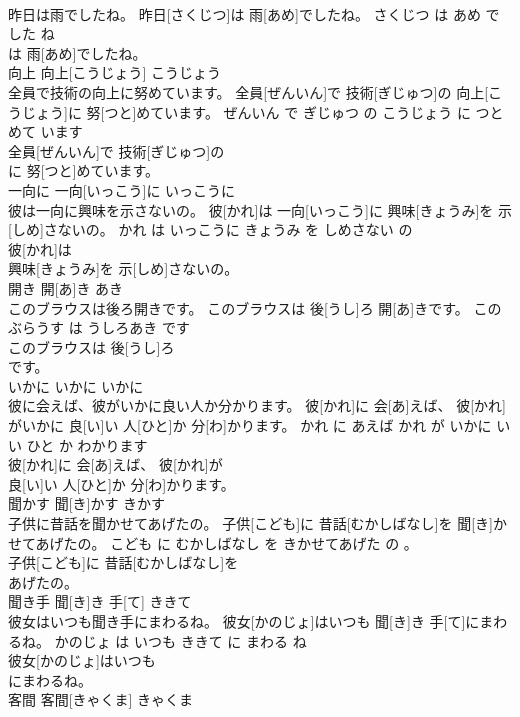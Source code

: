 \documentclass[8pt]{extreport}
\begin{document}
\begin{CJK}{UTF8}{min}
\\	昨日は雨でしたね。	昨日[さくじつ]は 雨[あめ]でしたね。	さくじつ は あめ でした ね	
\\	は 雨[あめ]でしたね。			
\\	向上	向上[こうじょう]	こうじょう	
\\	全員で技術の向上に努めています。	全員[ぜんいん]で 技術[ぎじゅつ]の 向上[こうじょう]に 努[つと]めています。	ぜんいん で ぎじゅつ の こうじょう に つとめて います	
\\	全員[ぜんいん]で 技術[ぎじゅつ]の
\\	に 努[つと]めています。			
\\	一向に	一向[いっこう]に	いっこうに	
\\	彼は一向に興味を示さないの。	彼[かれ]は 一向[いっこう]に 興味[きょうみ]を 示[しめ]さないの。	かれ は いっこうに きょうみ を しめさない の	
\\	彼[かれ]は
\\	興味[きょうみ]を 示[しめ]さないの。			
\\	開き	開[あ]き	あき	
\\	このブラウスは後ろ開きです。	このブラウスは 後[うし]ろ 開[あ]きです。	この ぶらうす は うしろあき です	
\\	このブラウスは 後[うし]ろ
\\	です。			
\\	いかに	いかに	いかに	
\\	彼に会えば、彼がいかに良い人か分かります。	彼[かれ]に 会[あ]えば、 彼[かれ]がいかに 良[い]い 人[ひと]か 分[わ]かります。	かれ に あえば かれ が いかに いい ひと か わかります	
\\	彼[かれ]に 会[あ]えば、 彼[かれ]が
\\	良[い]い 人[ひと]か 分[わ]かります。			
\\	聞かす	聞[き]かす	きかす	
\\	子供に昔話を聞かせてあげたの。	子供[こども]に 昔話[むかしばなし]を 聞[き]かせてあげたの。	こども に むかしばなし を きかせてあげた の 。	
\\	子供[こども]に 昔話[むかしばなし]を
\\	あげたの。			
\\	聞き手	聞[き]き 手[て]	ききて	
\\	彼女はいつも聞き手にまわるね。	彼女[かのじょ]はいつも 聞[き]き 手[て]にまわるね。	かのじょ は いつも ききて に まわる ね	
\\	彼女[かのじょ]はいつも
\\	にまわるね。			
\\	客間	客間[きゃくま]	きゃくま	

\end{CJK}
\end{document}
